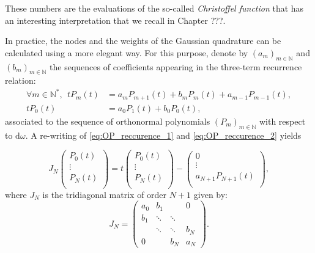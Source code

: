 \documentclass[twoside,11pt]{book}
\begin{document}
These numbers are the evaluations of the so-called \emph{Christoffel function} that has an interesting interpretation that we recall in Chapter ???. 



In practice, the nodes and the weights of the Gaussian quadrature can be calculated using a more elegant way. For this purpose, denote by $(a_{m})_{m \in \mathbb{N}}$ and $(b_{m})_{m \in \mathbb{N}}$ the sequences of coefficients appearing in the three-term recurrence relation:
\begin{align}\label{eq:OP_reccurence_1}
\forall m \in \mathbb{N}^{*}, \:\:t P_{m}(t) & = a_{m}P_{m+1}(t) + b_{m}P_{m}(t) + a_{m-1}P_{m-1}(t),\\
\label{eq:OP_reccurence_2}
t P_{0}(t) & = a_{0}P_{1}(t) + b_{0}P_{0}(t) ,
\end{align}
associated to the sequence of orthonormal polynomials $(P_{m})_{m \in \mathbb{N}}$ with respect to $\mathrm{d}\omega$. A re-writing of \eqref{eq:OP_reccurence_1} and \eqref{eq:OP_reccurence_2} yields 

\begin{equation}\label{eq:matrix_OP_reccurence}
J_{N} \begin{pmatrix}
P_{0}(t)  \\
\vdots \\
P_{N}(t) \\
\end{pmatrix} = t \begin{pmatrix}
P_{0}(t)  \\
\vdots \\
P_{N}(t) \\
\end{pmatrix} - \begin{pmatrix}
0  \\
\vdots \\
a_{N+1}P_{N+1}(t) \\
\end{pmatrix},
\end{equation}
where $J_{N}$ is the tridiagonal matrix of order $N+1$ given by:
\begin{equation}
J_N = \left( \begin{array}{cccc}
a_{0} & b_{1} & & 0\\
b_{1} & \ddots & \ddots & \\
& \ddots & \ddots & b_{N} \\
0 & & b_{N} & a_{N} \end{array} \right) .
\end{equation}
\end{document}
